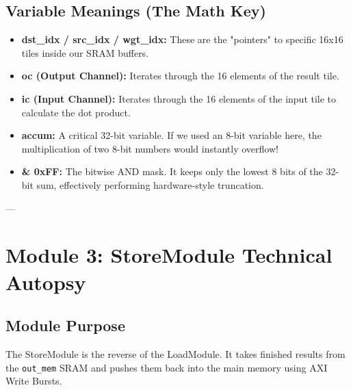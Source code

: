 \documentclass[11pt,a4paper]{report}
\begin{document}
\section{Variable Meanings (The Math Key)}
\begin{itemize}
    \item \textbf{dst\_idx / src\_idx / wgt\_idx:} These are the "pointers" to specific 16x16 tiles inside our SRAM buffers.
    \item \textbf{oc (Output Channel):} Iterates through the 16 elements of the result tile.
    \item \textbf{ic (Input Channel):} Iterates through the 16 elements of the input tile to calculate the dot product.
    \item \textbf{accum:} A critical 32-bit variable. If we used an 8-bit variable here, the multiplication of two 8-bit numbers would instantly overflow!
    \item \textbf{\& 0xFF:} The bitwise AND mask. It keeps only the lowest 8 bits of the 32-bit sum, effectively performing hardware-style truncation.
\end{itemize}

---

\chapter{Module 3: StoreModule Technical Autopsy}

\section{Module Purpose}
The StoreModule is the reverse of the LoadModule. It takes finished results from the \texttt{out\_mem} SRAM and pushes them back into the main memory using AXI Write Bursts.
\end{document}
